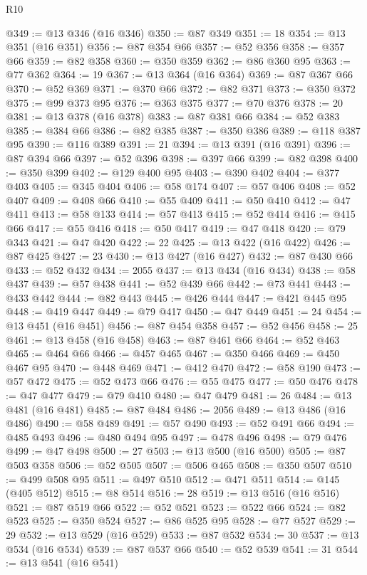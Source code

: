 \begin{lexlean}{R10}
\begin{coremodule}
@349 := @13 @346 (@16 @346)
@350 := @87 @349
@351 := 18
@354 := @13 @351 (@16 @351)
@356 := @87 @354 @66
@357 := @52 @356
@358 := @357 @66
@359 := @82 @358
@360 := @350 @359
@362 := @86 @360 @95
@363 := @77 @362
@364 := 19
@367 := @13 @364 (@16 @364)
@369 := @87 @367 @66
@370 := @52 @369
@371 := @370 @66
@372 := @82 @371
@373 := @350 @372
@375 := @99 @373 @95
@376 := @363 @375
@377 := @70 @376
@378 := 20
@381 := @13 @378 (@16 @378)
@383 := @87 @381 @66
@384 := @52 @383
@385 := @384 @66
@386 := @82 @385
@387 := @350 @386
@389 := @118 @387 @95
@390 := @116 @389
@391 := 21
@394 := @13 @391 (@16 @391)
@396 := @87 @394 @66
@397 := @52 @396
@398 := @397 @66
@399 := @82 @398
@400 := @350 @399
@402 := @129 @400 @95
@403 := @390 @402
@404 := @377 @403
@405 := @345 @404
@406 := @58 @174
@407 := @57 @406
@408 := @52 @407
@409 := @408 @66
@410 := @55 @409
@411 := @50 @410
@412 := @47 @411
@413 := @58 @133
@414 := @57 @413
@415 := @52 @414
@416 := @415 @66
@417 := @55 @416
@418 := @50 @417
@419 := @47 @418
@420 := @79 @343
@421 := @47 @420
@422 := 22
@425 := @13 @422 (@16 @422)
@426 := @87 @425
@427 := 23
@430 := @13 @427 (@16 @427)
@432 := @87 @430 @66
@433 := @52 @432
@434 := 2055
@437 := @13 @434 (@16 @434)
@438 := @58 @437
@439 := @57 @438
@441 := @52 @439 @66
@442 := @73 @441
@443 := @433 @442
@444 := @82 @443
@445 := @426 @444
@447 := @421 @445 @95
@448 := @419 @447
@449 := @79 @417
@450 := @47 @449
@451 := 24
@454 := @13 @451 (@16 @451)
@456 := @87 @454 @358
@457 := @52 @456
@458 := 25
@461 := @13 @458 (@16 @458)
@463 := @87 @461 @66
@464 := @52 @463
@465 := @464 @66
@466 := @457 @465
@467 := @350 @466
@469 := @450 @467 @95
@470 := @448 @469
@471 := @412 @470
@472 := @58 @190
@473 := @57 @472
@475 := @52 @473 @66
@476 := @55 @475
@477 := @50 @476
@478 := @47 @477
@479 := @79 @410
@480 := @47 @479
@481 := 26
@484 := @13 @481 (@16 @481)
@485 := @87 @484
@486 := 2056
@489 := @13 @486 (@16 @486)
@490 := @58 @489
@491 := @57 @490
@493 := @52 @491 @66
@494 := @485 @493
@496 := @480 @494 @95
@497 := @478 @496
@498 := @79 @476
@499 := @47 @498
@500 := 27
@503 := @13 @500 (@16 @500)
@505 := @87 @503 @358
@506 := @52 @505
@507 := @506 @465
@508 := @350 @507
@510 := @499 @508 @95
@511 := @497 @510
@512 := @471 @511
@514 := @145 (@405 @512)
@515 := @8 @514
@516 := 28
@519 := @13 @516 (@16 @516)
@521 := @87 @519 @66
@522 := @52 @521
@523 := @522 @66
@524 := @82 @523
@525 := @350 @524
@527 := @86 @525 @95
@528 := @77 @527
@529 := 29
@532 := @13 @529 (@16 @529)
@533 := @87 @532
@534 := 30
@537 := @13 @534 (@16 @534)
@539 := @87 @537 @66
@540 := @52 @539
@541 := 31
@544 := @13 @541 (@16 @541)

\end{coremodule}
\end{lexlean}
